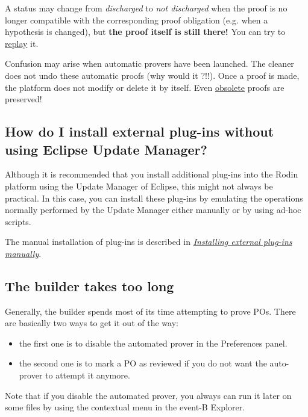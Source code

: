 A status may change from \emph{discharged} to \emph{not discharged} when the proof is no longer compatible with the corresponding proof obligation (e.g. when a hypothesis is changed), but \textbf{the proof itself is still there!}
You can try to \href{http://wiki.event-b.org/index.php/Proof_Obligation_Commands#Proof_Replay_on_Undischarged_POs}{replay} it.

Confusion may arise when automatic provers have been launched. The cleaner does not undo these automatic proofs (why would it ?!!). Once a proof is made, the platform does not modify or delete it by itself. Even \href{http://wiki.event-b.org/index.php/Proof_Purger_Interface#Why_proofs_become_obsolete}{obsolete} proofs are preserved!

\subsection{How do I install external plug-ins without using Eclipse Update Manager?}

Although it is recommended that you install additional plug-ins into the Rodin platform using the Update Manager of Eclipse, this might not always be practical. In this case, you can install these plug-ins by emulating the operations normally performed by the Update Manager either manually or by using ad-hoc scripts. 

The manual installation of plug-ins is described in \href{http://wiki.event-b.org/index.php/Installing_external_plug-ins_manually}{\emph{Installing external plug-ins manually}}. 

\subsection{The builder takes too long}

Generally, the builder spends most of its time attempting to prove POs. There are basically two ways to get it out of the way: 

\begin{itemize}
	\item the first one is to disable the automated prover in the \textsf{Preferences} panel. 
	\item the second one is to mark a PO as reviewed if you do not want the auto-prover to attempt it anymore. 
\end{itemize}

Note that if you disable the automated prover, you always can run it later on some files by using the contextual menu in the event-B Explorer. 

